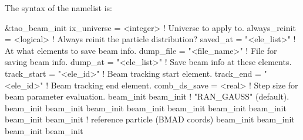 {{{{{{{{{{{{The syntax of the  namelist is:
\begin{example}
  &tao_beam_init
    ix_universe               = <integer>     ! Universe to apply to.
    always_reinit             = <logical>     ! Always reinit the particle distribution?
    saved_at                  = "<ele_list>"  ! At what elements to save beam info.
    dump_file                 = "<file_name>" ! File for saving beam info.
    dump_at                   = "<ele_list>"  ! Save beam info at these elements.
    track_start               = "<ele_id>"    ! Beam tracking start element.
    track_end                 = "<ele_id>"    ! Beam tracking end element.
    comb_ds_save              = <real>        ! Step size for beam parameter evaluation.
    beam_init%
    beam_init%
                                              !   "RAN_GAUSS" (default).
    beam_init%
    beam_init%
    beam_init%
    beam_init%
    beam_init%
    beam_init%
    beam_init%
    beam_init%
    beam_init%
                                              !   reference particle (BMAD coords)
    beam_init%
    beam_init%
    beam_init%
    beam_init%

\end{example}}}}}}}}}}}}}
